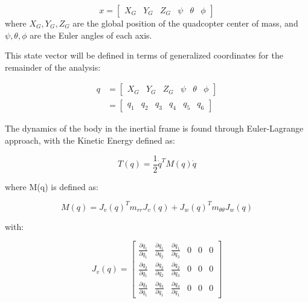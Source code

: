 \documentclass[twoside,twocolumn]{article}
\begin{document}
\begin{equation}
x=[\begin{array}{cccccc}
X_{G} & Y_{G} & Z_{G} & \psi & \theta & \phi\end{array}]
\end{equation}
where $X_{G},Y_{G},Z_{G}$ are the global position of the quadcopter center of mass, and $\psi,\theta,\phi$ are the Euler angles of each axis.

This state vector will be defined in terms of generalized coordinates for the remainder of the analysis:

\begin{equation}
\begin{split}
q &= [\begin{array}{cccccc}
X_{G} & Y_{G} & Z_{G} & \psi & \theta & \phi\end{array}] \\
&= [\begin{array}{cccccc}
q_{1} & q_{2} & q_{3} & q_{4} & q_{5} & q_{6}\end{array}]
\end{split}
\end{equation}

The dynamics of the body in the inertial frame is found through Euler-Lagrange approach, with the Kinetic Energy defined as:

\begin{equation}
T(q)=\frac{1}{2}\dot{q}^{T}M(q)\dot{q}
\end{equation}

where M(q) is defined as:

\begin{equation}
M(q)=J_{v}(q)^{T}m_{rr}J_{v}(q)+J_{w}(q)^{T}m_{\theta\theta}J_{w}(q)
\end{equation}

with:

\begin{equation}
J_{v}(q)=\left[\begin{array}{cccccc}
\frac{\partial q_{1}}{\partial q_{1}} & \frac{\partial q_{1}}{\partial q_{2}} & \frac{\partial q_{1}}{\partial q_{3}} & 0 & 0 & 0\\
\frac{\partial q_{2}}{\partial q_{1}} & \frac{\partial q_{2}}{\partial q_{2}} & \frac{\partial q_{2}}{\partial q_{3}} & 0 & 0 & 0\\
\frac{\partial q_{3}}{\partial q_{1}} & \frac{\partial q_{3}}{\partial q_{1}} & \frac{\partial q_{3}}{\partial q_{1}} & 0 & 0 & 0
\end{array}\right]
\end{equation}
\end{document}
